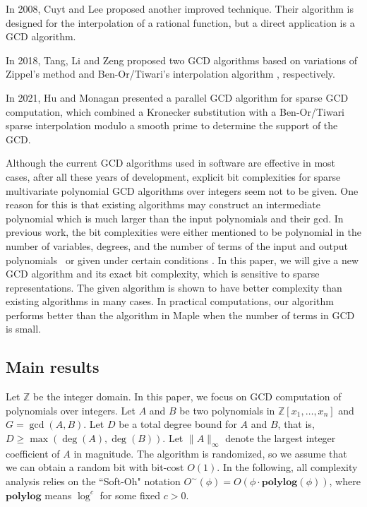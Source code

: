 \documentclass[final,20pt]{elsarticle}
\def\Z{{\mathbb Z}}
\begin{document}
In 2008, Cuyt and Lee \cite{cuyt2008new} proposed another improved technique.
Their algorithm is designed for the interpolation of a rational function, but a direct application is a GCD algorithm. %

In 2018, Tang, Li and Zeng \cite{tang2018computing} proposed
two GCD algorithms based on variations of Zippel's method and Ben-Or/Tiwari's interpolation algorithm \cite{Ben-OrT88}, respectively.

In 2021, Hu and Monagan \cite{hu2021fast} presented a parallel GCD algorithm for sparse GCD computation, which combined a Kronecker substitution with a Ben-Or/Tiwari \cite{Ben-OrT88} sparse interpolation modulo a smooth prime to determine the support of the GCD.


Although the current GCD algorithms used in software are effective in most cases, after all these years of development, explicit bit complexities for sparse multivariate polynomial GCD algorithms over integers seem not to be given.  One reason for this is that existing algorithms may construct an intermediate polynomial which is much larger than the input polynomials and their gcd. In previous work, the bit complexities were either mentioned to be polynomial in the number of variables, degrees, and the number of terms of the input and output polynomials~\cite{kaltofen1988greatest,kaltofen1990computing,tang2018computing,hu2021fast}
or given under certain conditions \cite{MosesY73,Wang80b,Zippel79}.
%
In this paper, we will give a new GCD algorithm and its exact bit complexity,
which is sensitive to sparse representations.
The given algorithm is shown to have better complexity than existing algorithms in many cases.
In practical computations, our algorithm performs better than the algorithm in Maple when the number of terms in GCD is small.

\subsection{Main results}
Let $\Z$ be the integer domain.
In this paper, we focus on GCD computation of polynomials over integers. Let $A$ and $B$ be two polynomials in $\Z[x_1,\dots,x_n]$ and $G=\gcd(A,B)$.  Let $D$ be a total degree bound for $A$ and $B$, that is, $D \ge \max(\deg(A),\deg(B))$.
Let $\|A\|_{\infty}$ denote the largest integer coefficient of $A$ in magnitude.
The algorithm is randomized, so we assume that we can obtain a random bit with bit-cost $O(1)$.
%
In the following, all complexity analysis relies on the ``Soft-Oh" notation $O^\sim(\phi)=O(\phi\cdot \mathbf{polylog}(\phi))$, where $\mathbf{polylog}$ means $\log^c$ for some fixed $c>0$.
\end{document}
